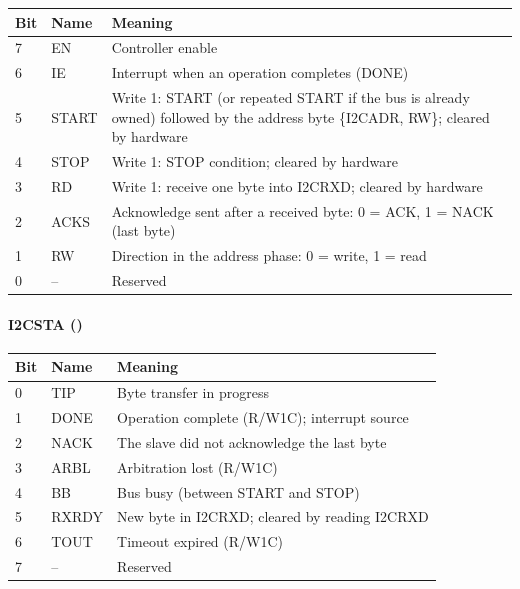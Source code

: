 \begin{center}
\small
\begin{tabularx}{\linewidth}{@{}l l X@{}}
  \toprule
  \textbf{Bit} & \textbf{Name} & \textbf{Meaning} \\
  \midrule
  7 & EN    & Controller enable \\
  6 & IE    & Interrupt when an operation completes (DONE) \\
  5 & START & Write 1: START (or repeated START if the bus is already owned)
              followed by the address byte \{I2CADR, RW\}; cleared by hardware \\
  4 & STOP  & Write 1: STOP condition; cleared by hardware \\
  3 & RD    & Write 1: receive one byte into I2CRXD; cleared by hardware \\
  2 & ACKS  & Acknowledge sent after a received byte: 0 = ACK, 1 = NACK (last byte) \\
  1 & RW    & Direction in the address phase: 0 = write, 1 = read \\
  0 & --    & Reserved \\
  \bottomrule
\end{tabularx}
\end{center}

\paragraph{I2CSTA ()}

\begin{center}
\small
\begin{tabularx}{\linewidth}{@{}l l X@{}}
  \toprule
  \textbf{Bit} & \textbf{Name} & \textbf{Meaning} \\
  \midrule
  0 & TIP   & Byte transfer in progress \\
  1 & DONE  & Operation complete (R/W1C); interrupt source \\
  2 & NACK  & The slave did not acknowledge the last byte \\
  3 & ARBL  & Arbitration lost (R/W1C) \\
  4 & BB    & Bus busy (between START and STOP) \\
  5 & RXRDY & New byte in I2CRXD; cleared by reading I2CRXD \\
  6 & TOUT  & Timeout expired (R/W1C) \\
  7 & --    & Reserved \\
  \bottomrule
\end{tabularx}
\end{center}

